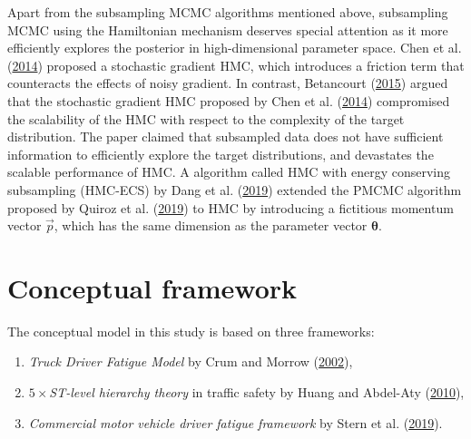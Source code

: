\documentclass[12pt]{book}
\numberwithin{equation}{chapter}
\providecommand{\tightlist}{%
  \setlength{\itemsep}{0pt}\setlength{\parskip}{0pt}}
\begin{document}
Apart from the subsampling MCMC algorithms mentioned above, subsampling MCMC using the Hamiltonian mechanism deserves special attention as it more efficiently explores the posterior in high-dimensional parameter space. Chen et al. (\protect\hyperlink{ref-chen2014stochastic}{2014}) proposed a stochastic gradient HMC, which introduces a friction term that counteracts the effects of noisy gradient. In contrast, Betancourt (\protect\hyperlink{ref-betancourt2015fundamental}{2015}) argued that the stochastic gradient HMC proposed by Chen et al. (\protect\hyperlink{ref-chen2014stochastic}{2014}) compromised the scalability of the HMC with respect to the complexity of the target distribution. The paper claimed that subsampled data does not have sufficient information to efficiently explore the target distributions, and devastates the scalable performance of HMC. A algorithm called HMC with energy conserving subsampling (HMC-ECS) by Dang et al. (\protect\hyperlink{ref-dang2019hamiltonian}{2019}) extended the PMCMC algorithm proposed by Quiroz et al. (\protect\hyperlink{ref-quiroz2019speeding}{2019}) to HMC by introducing a fictitious momentum vector \(\vec{p}\), which has the same dimension as the parameter vector \(\mathbf{\theta}\).

\hypertarget{conceptual-framework}{%
\section{Conceptual framework}\label{conceptual-framework}}

The conceptual model in this study is based on three frameworks:

\begin{enumerate}
\def\labelenumi{\arabic{enumi}.}
\tightlist
\item
  \emph{Truck Driver Fatigue Model} by Crum and Morrow (\protect\hyperlink{ref-crum2002influence}{2002}),
\item
  \emph{\(5 \times\)ST-level hierarchy theory} in traffic safety by Huang and Abdel-Aty (\protect\hyperlink{ref-huang2010multilevel}{2010}),
\item
  \emph{Commercial motor vehicle driver fatigue framework} by Stern et al. (\protect\hyperlink{ref-stern2019data}{2019}).
\end{enumerate}
\end{document}
